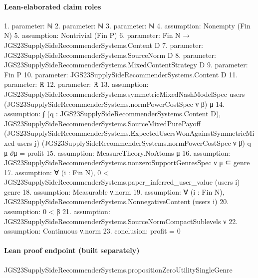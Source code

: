 \documentclass[10pt]{article}
\begin{document}
\paragraph{Lean-elaborated claim roles}\begin{ReviewVerbatim}
1. parameter: ℕ
2. parameter: ℕ
3. parameter: ℕ
4. assumption: Nonempty (Fin N)
5. assumption: Nontrivial (Fin P)
6. parameter: Fin N → JGS23SupplySideRecommenderSystems.Content D
7. parameter: JGS23SupplySideRecommenderSystems.SourceNorm D
8. parameter: JGS23SupplySideRecommenderSystems.MixedContentStrategy D
9. parameter: Fin P
10. parameter: JGS23SupplySideRecommenderSystems.Content D
11. parameter: ℝ
12. parameter: ℝ
13. assumption: JGS23SupplySideRecommenderSystems.symmetricMixedNashModelSpec users
  (JGS23SupplySideRecommenderSystems.normPowerCostSpec ν β) μ
14. assumption: ∫ (q : JGS23SupplySideRecommenderSystems.Content D),
    JGS23SupplySideRecommenderSystems.SourceMixedPurePayoff
      (JGS23SupplySideRecommenderSystems.ExpectedUsersWonAgainstSymmetricMixed users j)
      (JGS23SupplySideRecommenderSystems.normPowerCostSpec ν β) q μ ∂μ =
  profit
15. assumption: MeasureTheory.NoAtoms μ
16. assumption: JGS23SupplySideRecommenderSystems.nonzeroSupportGenresSpec ν μ ⊆ {genre}
17. assumption: ∀ (i : Fin N), 0 < JGS23SupplySideRecommenderSystems.paper_inferred_user_value (users i) genre
18. assumption: Measurable ν.norm
19. assumption: ∀ (i : Fin N), JGS23SupplySideRecommenderSystems.NonnegativeContent (users i)
20. assumption: 0 < β
21. assumption: JGS23SupplySideRecommenderSystems.SourceNormCompactSublevels ν
22. assumption: Continuous ν.norm
23. conclusion: profit = 0
\end{ReviewVerbatim}

\paragraph{Lean proof endpoint (built separately)}\begin{ReviewVerbatim}
JGS23SupplySideRecommenderSystems.propositionZeroUtilitySingleGenre
\end{ReviewVerbatim}
\end{document}
